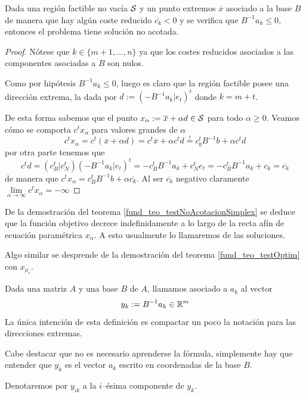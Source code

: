 \begin{theo}
	\label{fund_teo_testNoAcotacionSimplex}
	Dada una región factible no vacía $\mathcal{S}$ y un punto extremos $\overline{x}$ asociado a la base $B$ de manera que hay algún coste reducido $\overline{c_k}<0$ y se verifica que $B^{-1}a_k\leq 0$, entonces el problema tiene solución no acotada.
\end{theo}
\begin{proof}
	Nótese que $k\in\{m+1,\dots,n\}$ ya que los costes reducidos asociados a las componentes asociadas a $B$ son nulos.
	
	Como por hipótesis $B^{-1}a_k\leq 0$, luego es claro que la región factible posee una dirección extrema, la dada por $d:=(-B^{-1}a_k|e_t)^t$ donde $k=m+t$.
	
	De esta forma sabemos que el punto $x_\alpha:=\overline{x}+\alpha d\in\mathcal{S}$ para todo $\alpha\geq 0$. Veamos cómo se comporta $c^tx_\alpha$ para valores grandes de $\alpha$
	\begin{equation*}
		c^tx_\alpha=c^t(\overline{x}+\alpha d)=c^t\overline{x}+\alpha c^td\stackrel{!}{=}c_b^tB^{-1}b+\alpha c^td
	\end{equation*}
	por otra parte tenemos que
	\begin{equation*}
		c^td =(c_B^t|c_N^t)(-B^{-1}a_k|e_t)^t=-c_B^tB^{-1}a_k+c_N^te_t=-c_B^tB^{-1}a_k+c_k=\overline{c_k}
	\end{equation*}
	de manera que $c^tx_\alpha=c_B^tB^{-1}b+\alpha\overline{c_k}$. Al ser $\overline{c_k}$ negativo claramente $\lim\limits_{\alpha\to\infty}c^tx_\alpha=-\infty$
\end{proof}
\begin{obs}
	De la demostración del teorema \ref{fund_teo_testNoAcotacionSimplex} se deduce que la función objetivo decrece indefinidamente a lo largo de la recta afín de ecuación paramétrica $x_\alpha$. A esto usualmente lo llamaremos  de las soluciones.
	
	Algo similar se desprende de la demostración del teorema \ref{fund_teo_testOptim} con $x_{\mu_r}$.
\end{obs}
\begin{defi}
	\label{fund_defi_vectorAux}
	Dada una matriz $A$ y una base $B$ de $A$, llamamos  asociado a $a_k$ al vector
	\begin{equation*}
		y_k:=B^{-1}a_k\in\mathbb{R}^m
	\end{equation*}
	La única intención de esta definición es compactar un poco la notación para las direcciones extremas.
	
	Cabe destacar que no es necesario aprenderse la fórmula, simplemente hay que entender que $y_k$ es el vector $a_k$ escrito en coordenadas de la base $B$.
	
	Denotaremos por $y_{ik}$ a la $i$--ésima componente de $y_k$.
\end{defi}
